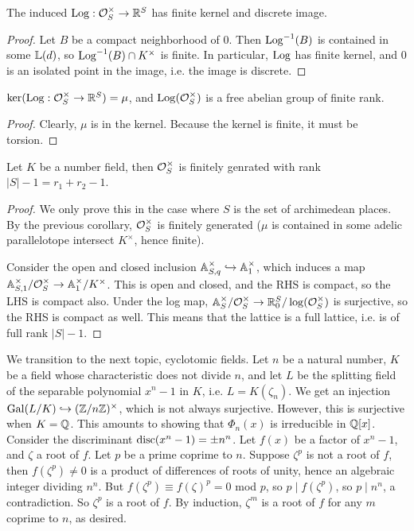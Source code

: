 \documentclass[11pt]{amsart}
\begin{document}
\begin{lem}
    The induced $\operatorname{Log}: \mathcal{O}_S^{\times}\to \mathbb{R}^S$ has finite kernel and discrete image.
\end{lem}

\begin{proof}
    Let $B$ be a compact neighborhood of $0$. Then $\operatorname{Log}^{-1}(B)$ is contained in some $\mathbb{L}(d)$, so $\operatorname{Log}^{-1}(B)\cap K^{\times}$ is finite. In particular, $\operatorname{Log}$ has finite kernel, and $0$ is an isolated point in the image, i.e. the image is discrete.
\end{proof}

\begin{cor}
    $\ker(\operatorname{Log}: \mathcal{O}_S^{\times}\to \mathbb{R}^S) = \mu$, and $\operatorname{Log}(\mathcal{O}_S^{\times})$ is a free abelian group of finite rank.
\end{cor}

\begin{proof}
    Clearly, $\mu$ is in the kernel. Because the kernel is finite, it must be torsion.
\end{proof}


\begin{thm}
    Let $K$ be a number field, then $\mathcal{O}_S^{\times}$ is finitely genrated with rank $|S|-1 = r_1 + r_2 - 1$.
\end{thm}


\begin{proof}
    We only prove this in the case where $S$ is the set of archimedean places. By the previous corollary, $\mathcal{O}_S^{\times}$ is finitely generated ($\mu$ is contained in some adelic parallelotope intersect $K^{\times}$, hence finite). 

    Consider the open and closed inclusion $\mathbb{A}^{\times}_{S, q}\hookrightarrow \mathbb{A}_1^{\times}$, which induces a map $\mathbb{A}_{S,1}^{\times}/\mathcal{O}_S^{\times}\to \mathbb{A}_1^{\times}/K^{\times}$. This is open and closed, and the RHS is compact, so the LHS is compact also. Under the log map, $\mathbb{A}^{\times}_S/\mathcal{O}_S^{\times}\to \mathbb{R}^S_0/\log(\mathcal{O}_S^{\times})$ is surjective, so the RHS is compact as well. This means that the lattice is a full lattice, i.e. is of full rank $|S|-1$.
\end{proof}

We transition to the next topic, cyclotomic fields. Let $n$ be a natural number, $K$ be a field whose characteristic does not divide $n$, and let $L$ be the splitting field of the separable polynomial $x^n - 1$ in $K$, i.e. $L = K(\zeta_n)$. We get an injection $\operatorname{Gal}(L/K)\hookrightarrow (\mathbb{Z}/n\mathbb{Z})^{\times}$, which is not always surjective. However, this is surjective when $K = \mathbb{Q}$. This amounts to showing that $\Phi_n(x)$ is irreducible in $\mathbb{Q}[x]$. Consider the discriminant $\operatorname{disc}(x^n-1) = \pm n^n$. Let $f(x)$ be a factor of $x^n-1$, and $\zeta$ a root of $f$. Let $p$ be a prime coprime to $n$. Suppose $\zeta^p$ is not a root of $f$, then $f(\zeta^p)\neq 0$ is a product of differences of roots of unity, hence an algebraic integer dividing $n^n$. But $f(\zeta^p)\equiv f(\zeta)^p = 0$ mod $p$, so $p\mid f(\zeta^p)$, so $p\mid n^n$, a contradiction. So $\zeta^p$ is a root of $f$. By induction, $\zeta^m$ is a root of $f$ for any $m$ coprime to $n$, as desired.
\end{document}

